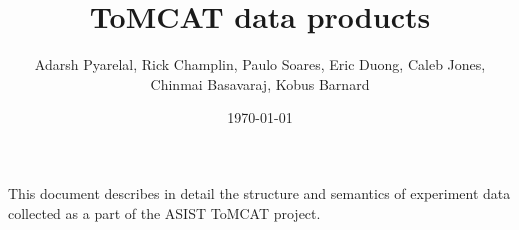\documentclass[11pt,letterpaper,oneside,openany,article]{memoir}
\title{ToMCAT data products}
\author{Adarsh Pyarelal, Rick Champlin, Paulo Soares, Eric Duong, Caleb
Jones, Chinmai Basavaraj, Kobus Barnard}
\date{\today}
\begin{document}
\maketitle
\setcounter{page}{2}


This document describes in detail the structure and semantics of experiment data
collected as a part of the ASIST ToMCAT project.




\end{document}
